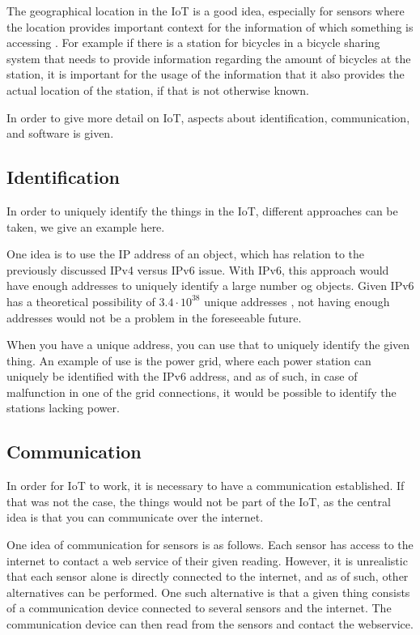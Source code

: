 The geographical location in the IoT is a good idea, especially for sensors where the location provides important context for the information of which something is accessing \citep{misc:locationMatters}.
For example if there is a station for bicycles in a bicycle sharing system that needs to provide information regarding the amount of bicycles at the station, it is important for the usage of the information that it also provides the actual location of the station, if that is not otherwise known.

In order to give more detail on IoT, aspects about identification, communication, and software is given.

\subsection{Identification}
In order to uniquely identify the things in the IoT, different approaches can be taken, we give an example here.

One idea is to use the IP address of an object, which has relation to the previously discussed IPv4 versus IPv6 issue.
With IPv6, this approach would have enough addresses to uniquely identify a large number og objects.
Given IPv6 has a theoretical possibility of $3.4 \cdot 10^{38}$ unique addresses \citep{misc:ipv6}, not having enough addresses would not be a problem in the foreseeable future.

When you have a unique address, you can use that to uniquely identify the given thing.
An example of use is the power grid, where each power station can uniquely be identified with the IPv6 address, and as of such, in case of malfunction in one of the grid connections, it would be possible to identify the stations lacking power.

\subsection{Communication}
In order for IoT to work, it is necessary to have a communication established.
If that was not the case, the things would not be part of the IoT, as the central idea is that you can communicate over the internet.

One idea of communication for sensors is as follows.
Each sensor has access to the internet to contact a web service of their given reading.
However, it is unrealistic that each sensor alone is directly connected to the internet, and as of such, other alternatives can be performed.
One such alternative is that a given thing consists of a communication device connected to several sensors and the internet.
The communication device can then read from the sensors and contact the webservice.

